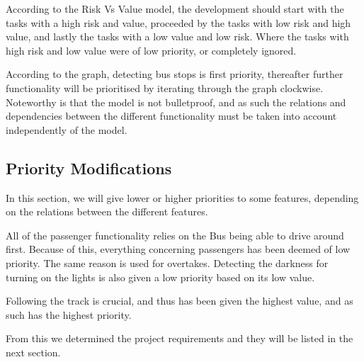 According to the Risk Vs Value model, the development should start with the tasks with a high risk and value, proceeded by the tasks with low risk and high value, and lastly the tasks with a low value and low risk. Where the tasks with high risk and low value were of low priority, or completely ignored. 

According to the graph, detecting bus stops is first priority, thereafter further functionality will be prioritised by iterating through the graph clockwise. Noteworthy is that the model is not bulletproof, and as such the relations and dependencies between the different functionality must be taken into account independently of the model.

\subsection{Priority Modifications}

In this section, we will give lower or higher priorities to some features, depending on the relations between the different features.

All of the passenger functionality relies on the Bus being able to drive around first. Because of this, everything concerning passengers has been deemed of low priority. The same reason is used for overtakes. Detecting the darkness for turning on the lights is also given a low priority based on its low value.

Following the track is crucial, and thus has been given the highest value, and as such has the highest priority.

From this we determined the project requirements and they will be listed in the next section.
